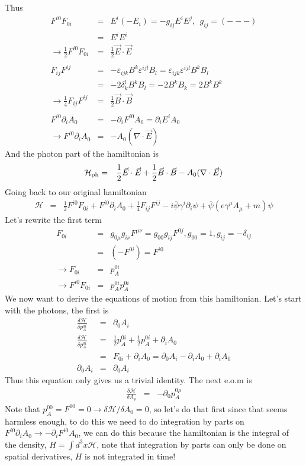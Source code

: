 \documentclass[aps,preprint,preprintnumbers,nofootinbib,showpacs,prd]{revtex4-1}
\newcommand{\nbea}{\begin{eqnarray*}}
\newcommand{\neea}{\end{eqnarray*}}
\begin{document}
Thus
%
\nbea
F^{i 0}F_{0 i} & = & E^i(-E_i) = - g_{ij} E^i E^j, ~~ g_{ij} = (- - -) \\
& = & E^i E^i \\
\rightarrow \frac{1}{2} F^{i 0}F_{0 i}  & = & \frac{1}{2} \vec E \cdot \vec E \\ \\
F_{ij}F^{ij} & = & -\varepsilon_{ijk} B^k \varepsilon^{ijl} B_l =  \varepsilon_{ijk} \varepsilon^{ijl} B^k B_l \\
& = & -2 \delta_k^l B^k B_l = -2 B^k B_k  = 2 B^k B^k\\
\rightarrow \frac{1}{4} F_{ij}F^{ij}  & = & \frac{1}{2} \vec B \cdot \vec B \\ \\
F^{i 0} \partial_i A_0 & = & - \partial_i F^{i 0}  A_0 = \partial_i E^i A_0 \\
\rightarrow F^{i 0} \partial_i A_0 & = & -A_0 (\nabla \cdot \vec E)
\neea
%
And the photon part of the hamiltonian is
%
\nbea
\mathcal{H}_{\rm ph} & = & \frac{1}{2} \vec E \cdot \vec E + \frac{1}{2} \vec B \cdot \vec B - A_0 (\nabla \cdot \vec E)
\neea
%
Going back to our original hamiltonian
%
\nbea
\mathcal{H} & = & \frac{1}{2} F^{i 0} F_{0 i} + F^{i 0} \partial_i A_0 + \frac{1}{4} F_{ij}F^{ij} - i \overline \psi \gamma^i \partial_i \psi + \overline \psi \left ( e \gamma^\mu A_\mu + m\right ) \psi
\neea
%
Let's rewrite the first term
%
\nbea
F_{0 i} & = & g_{0 \mu} g_{i \nu} F^{\mu \nu} = g_{0 0} g_{i j} F^{0 j}, g_{00} = 1, g_{ij} = -\delta_{ij} \\
& = & (-F^{0 i}) = F^{i 0} \\
\rightarrow F_{0 i}  & = & p^{0 i}_A \\
\rightarrow F^{i 0} F_{0 i} & = & p^{0 i}_A p^{0 i}_A
\neea
%
We now want to derive the equations of motion from this hamiltonian. Let's start with the photons, the first is
%
\nbea
\frac{\delta \mathcal{H}}{\delta p^{0 i}_A} & = & \partial_0 A_i \\
\frac{\delta \mathcal{H}}{\delta p^{0 i}_A} & = & \frac{1}{2}p^{0 i}_A + \frac{1}{2}p^{0 i}_A + \partial_i A_0 \\
& = & F_{0 i} + \partial_i A_0 = \partial_0 A_i - \partial_i A_0 + \partial_i A_0 \\
\partial_0 A_i & = & \partial_0 A_i 
\neea
%
Thus this equation only gives us a trivial identity. The next e.o.m is
%
\nbea
\frac{\delta \mathcal{H}}{\delta A_\rho} & = & -\partial_0 p^{0 \rho}_A
\neea
%
Note that $p_A^{00} = F^{00} = 0 \rightarrow {\delta \mathcal{H}}/{\delta A_0} = 0$, so let's do that first since that seems harmless enough, to do this we need to do integration by parts on $F^{i 0} \partial_i A_0 \rightarrow - \partial_i F^{i 0} A_0$, we can do this because the hamiltonian is the integral of the density, $H = \int d^3x \mathcal{H}$, note that integration by parts can only be done on spatial derivatives, $H$ is not integrated in time!
\end{document}

